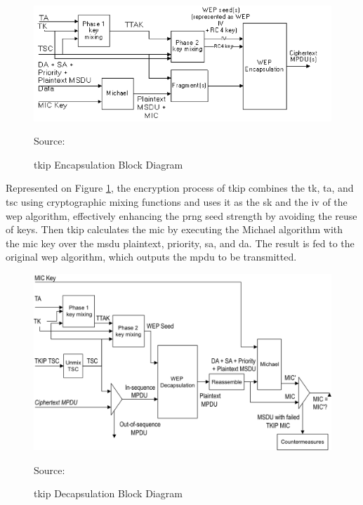 \begin{figure}[h]
    \centering
    \includegraphics[width=\linewidth]{contents/background-in-wireless-networks/protected-network-standards/wpa/tkip/tkip-encapsulation-block-diagram.png}
    \caption{\gls{tkip} Encapsulation Block Diagram}
    {Source: \cite{ieee_80211_2020}}
    \label{figure:ieee80211_figure43c}
\end{figure}

Represented on Figure \ref{figure:ieee80211_figure43c}, the encryption process of \gls{tkip} combines the \gls{tk}, \gls{ta}, and \gls{tsc} using cryptographic mixing functions and uses it as the \gls{sk} and the \gls{iv} of the \gls{wep} algorithm, effectively enhancing the \gls{prng} seed strength by avoiding the reuse of keys. Then \gls{tkip} calculates the \gls{mic} by executing the Michael algorithm with the \gls{mic} key over the \gls{msdu} plaintext, priority, \gls{sa}, and \gls{da}. The result is fed to the original \gls{wep} algorithm, which outputs the \gls{mpdu} to be transmitted.

\begin{figure}[h]
    \centering
    \includegraphics[width=\linewidth]{contents/background-in-wireless-networks/protected-network-standards/wpa/tkip/tkip-decapsulation-block-diagram.png}
    \caption{\gls{tkip} Decapsulation Block Diagram}
    {Source: \cite{ieee_80211_2020}}
    \label{figure:ieee80211_figure43d}
\end{figure}

